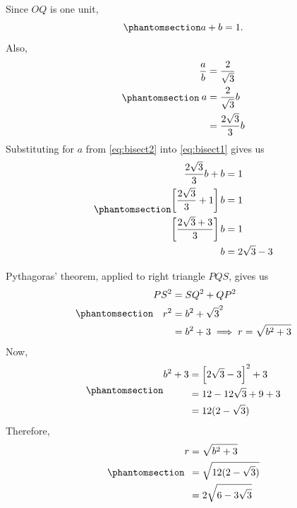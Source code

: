 \documentclass[
  a4paper,
]{article}
\begin{document}
Since \(OQ\) is one unit,
\begin{equation}\phantomsection\label{eq:bisect1}{
a+b = 1.
}\end{equation} Also, \begin{equation}\phantomsection\label{eq:bisect2}{
\begin{aligned}
\frac{a}{b} &= \frac{2}{\sqrt{3}}\\
a &= \frac{2}{\sqrt{3}}b\\
&= \frac{2\sqrt{3}}{3}b\\
\end{aligned}
}\end{equation} Substituting for \(a\) from \cref{eq:bisect2} into
\cref{eq:bisect1} gives us
\begin{equation}\phantomsection\label{eq:bisect3}{
\begin{aligned}
\frac{2\sqrt{3}}{3}b + b &= 1\\
\left[\frac{2\sqrt{3}}{3} + 1\right] b &= 1\\
\left[\frac{2\sqrt{3} + 3}{3}\right] b &= 1\\
b &= 2\sqrt{3} - 3\\
\end{aligned}
}\end{equation}

Pythagoras' theorem, applied to right triangle \(PQS\), gives us
\begin{equation}\phantomsection\label{eq:bisect4}{
\begin{aligned}
PS^2 &= SQ^2 + QP^2\\
r^2 &= b^2 + \sqrt{3}^2\\
&= b^2 +3 \implies r = \sqrt{b^2 + 3}\\
\end{aligned}
}\end{equation} Now, \begin{equation}\phantomsection\label{eq:bisect5}{
\begin{aligned}
b^2 + 3 &= \left[{2\sqrt{3} - 3}\right]^2 + 3\\
&= {12 - 12\sqrt{3} + 9 + 3} \\
&= 12(2 - \sqrt{3})
\end{aligned}
}\end{equation} Therefore,
\begin{equation}\phantomsection\label{eq:bisect6}{
\begin{aligned}
r &= \sqrt{b^2 + 3}\\
&= \sqrt{12(2 - \sqrt{3})}\\
&=2\sqrt{6 - 3\sqrt{3}}\\
\end{aligned}
}\end{equation}
\end{document}
